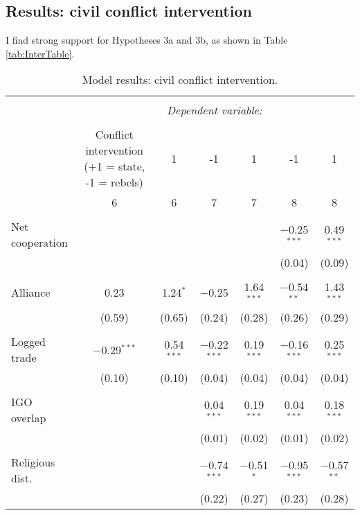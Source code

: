 \documentclass[10pt,]{article}
\begin{document}
\subsection{Results: civil conflict
intervention}\label{results-civil-conflict-intervention}

I find strong support for Hypotheses 3a and 3b, as shown in Table
\ref{tab:InterTable}.

\newpage

\begin{landscape}

\begin{table}[!htbp] \centering 
  \caption{\label{tab:InterTable}Model results: civil conflict intervention.} 
  \label{} 
\begin{tabular}{@{\extracolsep{5pt}}lcccccc} 
\\[-1.8ex]\hline 
\hline \\[-1.8ex] 
 & \multicolumn{6}{c}{\textit{Dependent variable:}} \\ 
\cline{2-7} 
\\[-1.8ex] & Conflict intervention (+1 = state, -1 = rebels) & 1 & -1 & 1 & -1 & 1 \\ 
 & 6 & 6 & 7 & 7 & 8 & 8 \\ 
\hline \\[-1.8ex] 
 Net cooperation &  &  &  &  & $-$0.25$^{***}$ & 0.49$^{***}$ \\ 
  &  &  &  &  & (0.04) & (0.09) \\ 
  & & & & & & \\ 
 Alliance & 0.23 & 1.24$^{*}$ & $-$0.25 & 1.64$^{***}$ & $-$0.54$^{**}$ & 1.43$^{***}$ \\ 
  & (0.59) & (0.65) & (0.24) & (0.28) & (0.26) & (0.29) \\ 
  & & & & & & \\ 
 Logged trade & $-$0.29$^{***}$ & 0.54$^{***}$ & $-$0.22$^{***}$ & 0.19$^{***}$ & $-$0.16$^{***}$ & 0.25$^{***}$ \\ 
  & (0.10) & (0.10) & (0.04) & (0.04) & (0.04) & (0.04) \\ 
  & & & & & & \\ 
 IGO overlap &  &  & 0.04$^{***}$ & 0.19$^{***}$ & 0.04$^{***}$ & 0.18$^{***}$ \\ 
  &  &  & (0.01) & (0.02) & (0.01) & (0.02) \\ 
  & & & & & & \\ 
 Religious dist. &  &  & $-$0.74$^{***}$ & $-$0.51$^{*}$ & $-$0.95$^{***}$ & $-$0.57$^{**}$ \\ 
  &  &  & (0.22) & (0.27) & (0.23) & (0.28) \\ 

\end{tabular}
\end{table}
\end{landscape}
\end{document}
